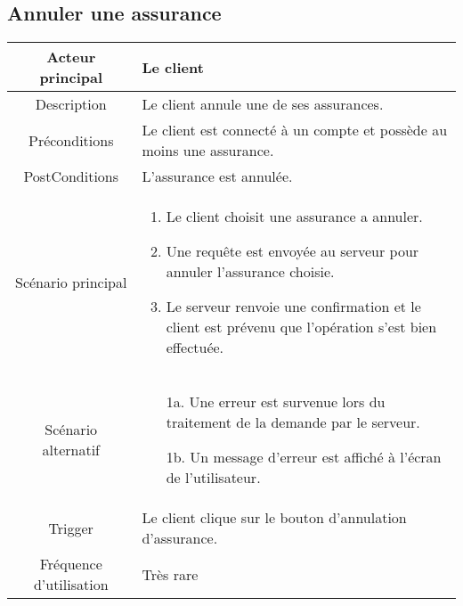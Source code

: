 \documentclass[]{article}
\begin{document}
\subsection{Annuler une assurance}
\begin{table}[h]
    \begin{tabular}{|c|p{10cm}|}
       \hline
       Acteur principal&Le client\\
       \hline
       Description&Le client annule une de ses assurances.\\
       \hline
       Préconditions&Le client est connecté à un compte et possède au moins une assurance.\\
       \hline
       PostConditions&L'assurance est annulée.\\
       \hline
       Scénario principal& 
             \begin{enumerate}
                \item Le client choisit une assurance a annuler.
                \item Une requête est envoyée au serveur pour annuler l'assurance choisie.
                \item Le serveur renvoie une confirmation et le client est prévenu que l'opération s'est bien effectuée.
             \end{enumerate}     \\
       \hline
       Scénario alternatif&  
       \begin{itemize}
        \item[1a.] Une erreur est survenue lors du traitement de la demande par le serveur.
        \item[1b.] Un message d'erreur est affiché à l'écran de l'utilisateur. 
        \end{itemize}    \\
       \hline
       Trigger&Le client clique sur le bouton d'annulation d'assurance.\\
       \hline
       Fréquence d'utilisation&Très rare\\
       \hline
    \end{tabular}
 \end{table}

\newpage

\end{document}
